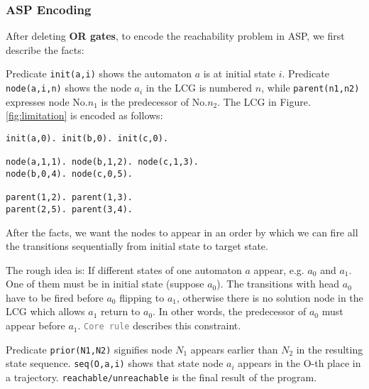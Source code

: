 \documentclass{entcs}
\begin{document}
\subsubsection*{ASP Encoding}

After deleting \textbf{OR gates}, to encode the reachability problem in ASP, we first describe the facts:

Predicate \texttt{init(a,i)} shows the automaton $a$ is at initial state $i$. %
Predicate \texttt{node(a,i,n)} shows the node $a_i$ in the LCG is numbered $n$, while \texttt{parent(n1,n2)} expresses node No.$n_1$ is the predecessor of No.$n_2$.
The LCG in Figure. \ref{fig:limitation} is encoded as follows:
\begin{Verbatim}[commandchars=\\\{\}]
init(a,0). init(b,0). init(c,0).

node(a,1,1). node(b,1,2). node(c,1,3).
node(b,0,4). node(c,0,5).

parent(1,2). parent(1,3).
parent(2,5). parent(3,4).
\end{Verbatim}

After the facts, we want the nodes to appear in an order by which we can fire all the transitions sequentially from initial state to target state. 

The rough idea is: If different states of one automaton $a$ appear, e.g. $a_0$ and $a_1$.
One of them must be in initial state (suppose $a_0$).
The transitions with head $a_0$ have to be fired before $a_0$ flipping to $a_1$, otherwise there is no solution node in the LCG which allows $a_1$ return to $a_0$.
In other words, the predecessor of $a_0$ must appear before $a_1$. \texttt{\textcolor{gray}{Core rule}} describes this constraint.

Predicate \texttt{prior(N1,N2)} signifies node $N_1$ appears earlier than $N_2$ in the resulting state sequence.
\texttt{seq(O,a,i)} shows that state node $a_i$ appears in the O-th place in a trajectory.
\texttt{reachable/unreachable} is the final result of the program.
\end{document}
